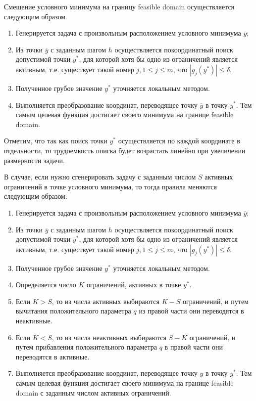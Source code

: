 \documentclass{aip-cp}
\begin{document}
Смещение условного минимума на границу feasible domain осуществляется следующим образом.
\begin{enumerate}
	\item Генерируется задача с произвольным расположением условного минимума $\overline{y}$;
	\item Из точки $\overline{y}$ с заданным шагом $h$ осуществляется покоординатный поиск допустимой точки $y^*$, для которой хотя бы одно из ограничений является активным, т.е. существует такой номер $j, 1 \leq j\leq m$, что $\left|g_j(y^*)\right| \leq \delta$. 
	\item Полученное грубое значение $y^*$ уточняется локальным методом. 
	\item Выполняется преобразование координат, переводящее точку $\overline{y}$ в точку $y^*$. Тем самым целевая функция достигает своего минимума на границе feasible domain. 
\end{enumerate}

Отметим, что так как поиск точки $y^*$ осуществляется по каждой координате в отдельности, то трудоемкость поиска будет возрастать линейно при увеличении размерности задачи.


В случае, если нужно сгенерировать задачу с заданным числом $S$ активных ограничений в точке условного минимума, то тогда правила меняются следующим образом.
\begin{enumerate}
	\item Генерируется задача с произвольным расположением условного минимума $\overline{y}$;
	\item Из точки $\overline{y}$ с заданным шагом $h$ осуществляется покоординатный поиск допустимой точки $y^*$, для которой хотя бы одно из ограничений является активным, т.е. существует такой номер $j, 1 \leq j\leq m$, что $\left|g_j(y^*)\right| \leq \delta$.  
	\item Полученное грубое значение $y^*$ уточняется локальным методом. 
	\item Определяется число $K$ ограничений, активных в точке $y^*$.
	\item Если $K>S$, то из числа активных выбираются $K-S$ ограничений, и путем вычитания положительного параметра $q$ из правой части они переводятся в неактивные.
	\item Если $K<S$, то из числа неактивных выбираются $S-K$ ограничений, и путем прибавления положительного параметра $q$ в правой части они переводятся в активные.
	\item Выполняется преобразование координат, переводящее точку $\overline{y}$ в точку $y^*$. Тем самым целевая функция достигает своего минимума на границе feasible domain с заданным числом активных ограничений. 
\end{enumerate}
\end{document}
